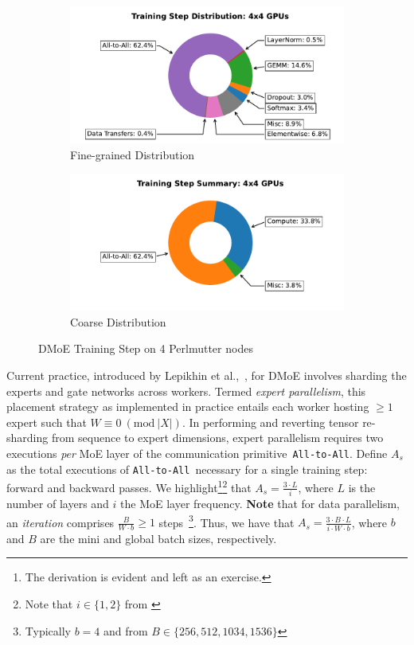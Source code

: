 \begin{figure}[!h]
    \begin{subfigure}{.5\linewidth}
        \centering
        \includegraphics[width=0.8\linewidth]{images/4x4_gpus_pie}
        \caption{Fine-grained Distribution}
        \label{multipie}
    \end{subfigure}\hfill %
    \begin{subfigure}{.5\linewidth}
        \centering
        \includegraphics[width=0.8\linewidth]{images/4x4_gpus_c_pie}
        \caption{Coarse Distribution}
        \label{multi_c_pie}
    \end{subfigure}
    \caption{\footnotesize DMoE Training Step on 4 Perlmutter nodes}
    \label{fig:donut}
\end{figure}
Current practice, introduced by Lepikhin et al.,~\cite{DBLP:journals/corr/abs-2006-16668}, for DMoE
involves sharding the experts and gate networks across workers.
Termed \emph{expert parallelism}, this placement strategy as implemented in practice entails
each worker hosting $\geq 1$ expert such that $W \equiv 0 \: (\mathrm{mod \:} |X|)$.
In performing and reverting tensor re-sharding from sequence to expert dimensions,
expert parallelism requires two executions \emph{per} MoE layer of the communication primitive~\verb|All-to-All|.
Define $A_s$ as the total executions of \verb|All-to-All|~necessary
for a single training step: forward and backward passes.
We highlight\footnote{The derivation is evident and left as an exercise.}\footnote{Note that $i \in \{1, 2\}$ from \cite{DBLP:journals/corr/abs-2101-03961,
    mixtral8x7B, DBLP:journals/corr/abs-2006-16668}}
that $A_s = \frac{3\cdot L}{i}$, where $L$ is the number of layers and $i$ the MoE layer frequency.
\textbf{Note} that for data parallelism, an \emph{iteration} comprises $\frac{B}{W\cdot b} \geq 1$
steps~\footnote{Typically $b = 4$ and from
\cite{DBLP:journals/corr/abs-2005-14165} $B \in \{256, 512, 1034, 1536\}$}.
Thus, we have that $A_s = \frac{3 \cdot B\cdot L}{i \cdot W \cdot b}$, where $b$ and $B$ are the mini and global
batch sizes, respectively.

